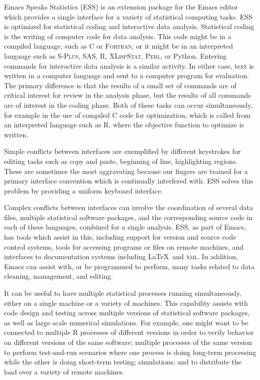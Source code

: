 \documentclass{article}
\newcommand*{\Splus}{\textsc{S-Plus}}
\newcommand*{\XLispStat}{\textsc{XLispStat}}
\newcommand*{\Perl}{\textsc{Perl}}
\newcommand*{\Fortran}{\textsc{Fortran}}
\begin{document}
Emacs Speaks Statistics (ESS) \citep{ESS} is an extension package for
the Emacs editor which provides a single interface for a variety of
statistical computing tasks.  ESS is optimized for statistical coding
and interactive data analysis.  Statistical coding is the writing of
computer code for data analysis.  This code might be in a compiled
language, such as C or \Fortran, or it might be in an interpreted
language such as \Splus, SAS, R, \XLispStat, \Perl, or Python.
Entering commands for interactive data analysis is a similar activity.
In either case, text is written in a computer language and sent to a
computer program for evaluation.  The primary difference is that the
results of a small set of commands are of critical interest for review
in the analysis phase, but the results of all commands are of interest
in the coding phase.  Both of these tasks can occur simultaneously,
for example in the use of compiled C code for optimization, which is
called from an interpreted language such as R, where the objective
function to optimize is written.

Simple conflicts between interfaces are exemplified by different
keystrokes for editing tasks such as copy and paste, beginning of
line, highlighting regions.  These are sometimes the most aggravating
because our fingers are trained for a primary interface convention
which is continually interfered with.  ESS solves this problem by
providing a uniform keyboard interface.

Complex conflicts between interfaces can involve the coordination of
several data files, multiple statistical software packages, and the
corresponding source code in each of these languages, combined for a
single analysis.  ESS, as part of Emacs, has tools which assist in
this, including support for version and source code control systems,
tools for accessing programs or files on remote machines, and
interfaces to documentation systems including \LaTeX\ and
\textsc{xml}.  In addition, Emacs can assist with, or be programmed to
perform, many tasks related to data cleaning, management, and editing.

It can be useful to have multiple statistical processes running
simultaneously, either on a single machine or a variety of machines.
This capability assists with code design and testing across multiple
versions of statistical software packages, as well as large scale
numerical simulations.  For example, one might want to be connected to
multiple R processes of different versions in order to verify behavior
on different versions of the same software; multiple processes of the
same version to perform test-and-run scenarios where one process is
doing long-term processing while the other is doing short-term
testing; simulations; and to distribute the load over a variety of
remote machines.
\end{document}

